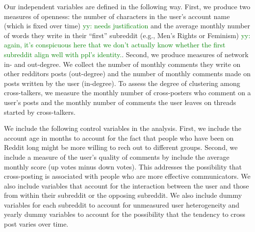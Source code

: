 \documentclass[letterpaper]{article}
\newcommand{\yy}[1]{{\textcolor{green}{yy: #1}}}
\newcommand{\del}[1]{{\textcolor{gray}{#1}}}
\begin{document}


Our independent variables are defined in the following way. First, we produce two measures of openness: the number of characters in the user's account name (which is fixed over time) \yy{needs justification} and the average monthly number of words they write in their ``first'' subreddit (e.g., Men's Rights or Feminism) \yy{again, it's conspicuous here that we don't actually know whether the first subreddit align well with ppl's identity.}. Second, we produce measures of network in- and out-degree. We collect the number of monthly comments they write on other redditors posts (out-degree) and the number of monthly comments made on posts written by the user (in-degree). To assess the degree of clustering among cross-talkers, we measure the monthly number of cross-posters who comment on a user's posts and the monthly number of comments the user leaves on threads started by cross-talkers. 

We include the following control variables in the analysis. First, we include the account age in months to account for the fact that people who have been on Reddit long might be more willing to rech out to different groups. Second, we include a measure of the user's quality of comments by include the average monthly score (up votes minus down votes). This addresses the possibility that cross-posting is associated with people who are more effective communicators. We also include variables that account for the interaction between the user and those from within their subreddit or the opposing subreddit. We also include dummy variables for each subreddit to account for unmeasured user heterogeneity and yearly dummy variables to account for the possibility that the tendency to cross post varies over time.
 
\end{document}
